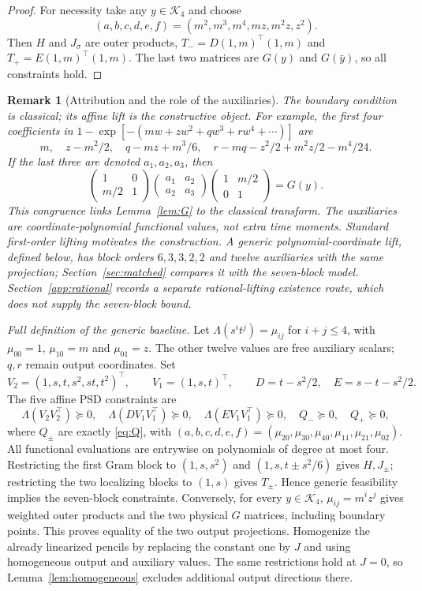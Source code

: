 \documentclass[pdflatex,sn-mathphys-num]{sn-jnl}
\theoremstyle{thmstyleone}
\theoremstyle{thmstyletwo}\newtheorem{remark}[theorem]{Remark}
\newcommand{\K}{\mathcal K}
\begin{document}
\begin{proof}
For necessity take any $y\in\K_4$ and choose
\[
 (a,b,c,d,e,f)=(m^2,m^3,m^4,mz,m^2z,z^2).
\]
Then $H$ and $J_\sigma$ are outer products,
$T_-=D(1,m)^\top(1,m)$ and $T_+=E(1,m)^\top(1,m)$.
The last two matrices are $G(y)$ and $G(\bar y)$, so all constraints hold.
\end{proof}

\begin{remark}[Attribution and the role of the auxiliaries]
The boundary condition is classical; its affine lift is the constructive object.
For example, the first four coefficients in
$1-\exp[-(m w+z w^2+q w^3+r w^4+\cdots)]$ are
\[
 m,\quad z-m^2/2,\quad q-mz+m^3/6,\quad
 r-mq-z^2/2+m^2z/2-m^4/24.
\]
If the last three are denoted $a_1,a_2,a_3$, then
\[
 \begin{pmatrix}1&0\\m/2&1\end{pmatrix}
 \begin{pmatrix}a_1&a_2\\a_2&a_3\end{pmatrix}
 \begin{pmatrix}1&m/2\\0&1\end{pmatrix}=G(y).
\]
This congruence links Lemma~\ref{lem:G} to the classical transform.
The auxiliaries are coordinate-polynomial functional values, not extra time
moments. Standard first-order lifting \cite{nie} motivates the construction.
A generic polynomial-coordinate lift, defined below, has block orders
$6,3,3,2,2$ and twelve auxiliaries with the same projection;
Section~\ref{sec:matched} compares it with the seven-block model.
Section~\ref{app:rational} records a separate
rational-lifting existence route, which does not supply the seven-block bound.
\end{remark}

\noindent\textit{Full definition of the generic baseline.}
Let $\Lambda(s^it^j)=\mu_{ij}$ for $i+j\le4$, with
$\mu_{00}=1$, $\mu_{10}=m$ and $\mu_{01}=z$. The other twelve values are
free auxiliary scalars; $q,r$ remain output coordinates. Set
\[
 V_2=(1,s,t,s^2,st,t^2)^\top,\qquad V_1=(1,s,t)^\top,
 \qquad D=t-s^2/2,\quad E=s-t-s^2/2.
\]
The five affine PSD constraints are
\[
 \Lambda(V_2V_2^\top)\succeq0,\quad
 \Lambda(DV_1V_1^\top)\succeq0,\quad
 \Lambda(EV_1V_1^\top)\succeq0,\quad Q_-\succeq0,\quad Q_+\succeq0,
\]
where $Q_\pm$ are exactly \eqref{eq:Q}, with
$(a,b,c,d,e,f)=(\mu_{20},\mu_{30},\mu_{40},\mu_{11},\mu_{21},\mu_{02})$.
All functional evaluations are entrywise on polynomials of degree at most four.
Restricting the first Gram block to $(1,s,s^2)$ and
$(1,s,t\pm s^2/6)$ gives $H,J_\pm$; restricting the two localizing
blocks to $(1,s)$ gives $T_\pm$. Hence generic feasibility implies
the seven-block constraints. Conversely, for every $y\in\K_4$,
$\mu_{ij}=m^iz^j$ gives weighted outer products and the two physical
$G$ matrices, including boundary points. This proves equality of the two
output projections. Homogenize the already linearized pencils by replacing
the constant one by $J$ and using homogeneous output and auxiliary values.
The same restrictions hold at $J=0$, so Lemma~\ref{lem:homogeneous}
excludes additional output directions there.
\end{document}
